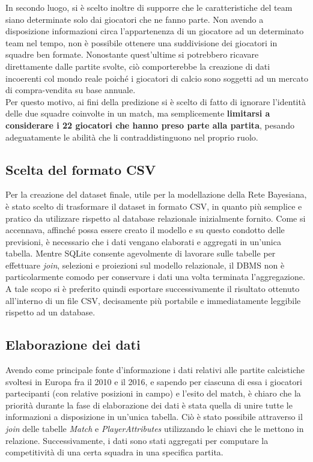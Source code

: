 \documentclass[hidelinks, 12pt]{article}
\begin{document}
In secondo luogo, si è scelto inoltre di supporre che le caratteristiche del team siano determinate solo dai giocatori che ne fanno parte. Non avendo a disposizione informazioni circa l'appartenenza di un giocatore ad un determinato team nel tempo, non è possibile ottenere una suddivisione dei giocatori in squadre ben formate. Nonostante quest'ultime si potrebbero ricavare direttamente dalle partite svolte, ciò comporterebbe la creazione di dati incoerenti col mondo reale poiché i giocatori di calcio sono soggetti ad un mercato di compra-vendita su base annuale. \\
Per questo motivo, ai fini della predizione si è scelto di fatto di ignorare l'identità delle due squadre coinvolte in un match, ma semplicemente \textbf{limitarsi a considerare i 22 giocatori che hanno preso parte alla partita}, pesando adeguatamente le abilità che li contraddistinguono nel proprio ruolo.



\subsection{Scelta del formato CSV}

Per la creazione del dataset finale, utile per la modellazione della Rete Bayesiana, è stato scelto di trasformare il dataset in formato CSV, in quanto più semplice e pratico da utilizzare rispetto al database relazionale inizialmente fornito. Come si accennava, affinché possa essere creato il modello e su questo condotto delle previsioni, è necessario che i dati vengano elaborati e aggregati in un'unica tabella. Mentre SQLite consente agevolmente di lavorare sulle tabelle per effettuare \textit{join}, selezioni e proiezioni sul modello relazionale, il DBMS non è particolarmente comodo per conservare i dati una volta terminata l'aggregazione. A tale scopo si è preferito quindi esportare successivamente il risultato ottenuto all'interno di un file CSV, decisamente più portabile e immediatamente leggibile rispetto ad un database.



\subsection{Elaborazione dei dati}
\label{sec:dataset-elab}

Avendo come principale fonte d'informazione i dati relativi alle partite calcistiche svoltesi in Europa fra il 2010 e il 2016, e sapendo per ciascuna di essa i giocatori partecipanti (con relative posizioni in campo) e l'esito del match, è chiaro che la priorità durante la fase di elaborazione dei dati è stata quella di unire tutte le informazioni a disposizione in un'unica tabella. Ciò è stato possibile attraverso il \textit{join} delle tabelle \textit{Match} e \textit{PlayerAttributes} utilizzando le chiavi che le mettono in relazione. Successivamente, i dati sono stati aggregati per computare la competitività di una certa squadra in una specifica partita.
\end{document}
